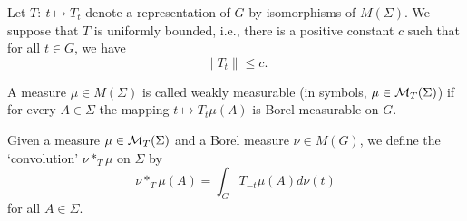 \documentclass[12pt,leqno]{article}
\def\cMT{{\cal M}_T(\Sigma)}
\begin{document}
Let
$T:\ t\mapsto T_t$ denote a representation of $G$
by isomorphisms of $M(\Sigma)$.  
We suppose that $T$ is uniformly bounded,
i.e., there is a positive constant $c$ such that
for all $t\in G$, we have
\begin{equation}
\|T_t\|\leq c .
\label{uniformlybded}
\end{equation}
\begin{defin}
A measure $\mu\in M(\Sigma)$ is 
called weakly measurable (in symbols, $\mu\in{\cal M}_T(\Sigma)$)
if for every $A\in \Sigma$ 
the mapping $t\mapsto T_t\mu(A)$ is 
Borel measurable on $G$.  
\label{weakmble}
\end{defin}


Given a measure $\mu\in \cMT$ and a Borel measure 
$\nu \in M(G)$, we define the `convolution' 
$\nu*_T\mu$ on $\Sigma$ by
\begin{equation}
\nu*_T\mu (A)=\int_G T_{-t}\mu(A) d\nu(t)
\label{Tconv}
\end{equation}
for all $A\in\Sigma$. 
\end{document}
